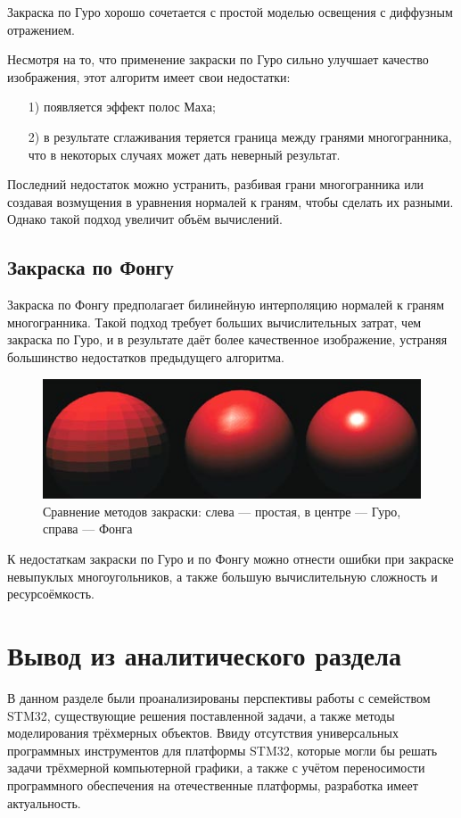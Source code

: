 Закраска по Гуро хорошо сочетается с простой моделью освещения с диффузным отражением.

Несмотря на то, что применение закраски по Гуро сильно улучшает качество изображения, этот алгоритм имеет свои недостатки:
\begin{enumerate}
	\item[1)] появляется эффект полос Маха;
	\item[2)] в результате сглаживания теряется граница между гранями многогранника, что в некоторых случаях может дать неверный результат.
\end{enumerate}

Последний недостаток можно устранить, разбивая грани многогранника или создавая возмущения в уравнения нормалей к граням, чтобы сделать их разными. Однако такой подход увеличит объём вычислений.

\subsection{Закраска по Фонгу}
Закраска по Фонгу предполагает билинейную интерполяцию нормалей к граням многогранника. Такой подход требует больших вычислительных затрат, чем закраска по Гуро, и в результате даёт более качественное изображение, устраняя большинство недостатков предыдущего алгоритма.

\begin{figure}[h]
	\centering
	\includegraphics[width=\textwidth ]{img/shading.png}
	\caption{Сравнение методов закраски: слева --- простая, в центре --- Гуро, справа --- Фонга}
\end{figure}

К недостаткам закраски по Гуро и по Фонгу можно отнести ошибки при закраске невыпуклых многоугольников, а также большую вычислительную сложность и ресурсоёмкость.

\section{Вывод из аналитического раздела}
В данном разделе были проанализированы перспективы работы с семейством STM32, существующие решения поставленной задачи, а также методы моделирования трёхмерных объектов. Ввиду отсутствия универсальных программных инструментов для платформы STM32, которые могли бы решать задачи трёхмерной компьютерной графики, а также с учётом переносимости программного обеспечения на отечественные платформы, разработка имеет актуальность.

